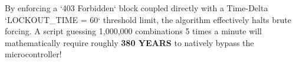 \begin{takeawaybox}
By enforcing a `403 Forbidden` block coupled directly with a Time-Delta `LOCKOUT\_TIME = 60` threshold limit, the algorithm effectively halts brute forcing. A script guessing 1,000,000 combinations 5 times a minute will mathematically require roughly \textbf{380 YEARS} to natively bypass the microcontroller!
\end{takeawaybox}
